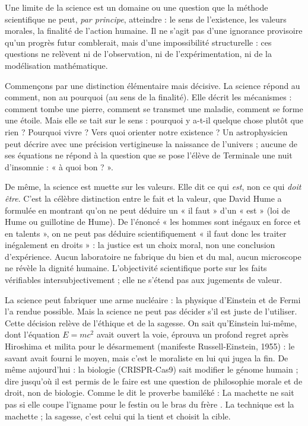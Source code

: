 \documentclass[11pt]{article}
\newcommand{\cle}[1]{{\popxbold\color{popdark}#1}}
\newcounter{popsec}
\newcounter{popsub}
\newcommand{\courssub}[1]{%
  \stepcounter{popsub}%
  \par\vspace{9pt}\noindent{\popxbold\fontsize{11.5}{13}\selectfont\color{popink}{\color{poporange}\thepopsec.\thepopsub}\hspace{6pt}#1}\par\nopagebreak\vspace{4pt}
}
\begin{document}
\courssub{Ce que la science ne peut pas dire : le sens et les valeurs}

\begin{definition}
Une \cle{limite} de la science est un domaine ou une question que la méthode scientifique ne peut, \emph{par principe}, atteindre : le sens de l'existence, les valeurs morales, la finalité de l'action humaine. Il ne s'agit pas d'une ignorance provisoire qu'un progrès futur comblerait, mais d'une impossibilité structurelle : ces questions ne relèvent ni de l'observation, ni de l'expérimentation, ni de la modélisation mathématique.
\end{definition}

Commençons par une distinction élémentaire mais décisive. La science répond au \cle{comment}, non au \cle{pourquoi} (au sens de la finalité). Elle décrit les mécanismes : comment tombe une pierre, comment se transmet une maladie, comment se forme une étoile. Mais elle se tait sur le sens : pourquoi y a-t-il quelque chose plutôt que rien ? Pourquoi vivre ? Vers quoi orienter notre existence ? Un astrophysicien peut décrire avec une précision vertigineuse la naissance de l'univers ; aucune de ses équations ne répond à la question que se pose l'élève de Terminale une nuit d'insomnie : « à quoi bon ? ».

De même, la science est muette sur les \cle{valeurs}. Elle dit ce qui \emph{est}, non ce qui \emph{doit être}. C'est la célèbre distinction entre le \cle{fait} et la \cle{valeur}, que David Hume a formulée en montrant qu'on ne peut déduire un « il faut » d'un « est » (loi de Hume ou guillotine de Hume). De l'énoncé « les hommes sont inégaux en force et en talents », on ne peut pas déduire scientifiquement « il faut donc les traiter inégalement en droits » : la justice est un choix moral, non une conclusion d'expérience. Aucun laboratoire ne fabrique du bien et du mal, aucun microscope ne révèle la dignité humaine. L'\cle{objectivité} scientifique porte sur les faits vérifiables intersubjectivement ; elle ne s'étend pas aux jugements de valeur.

\begin{exemplebox}
La science peut fabriquer une arme nucléaire : la physique d'Einstein et de Fermi l'a rendue possible. Mais la science ne peut pas décider s'il est juste de l'utiliser. Cette décision relève de l'\cle{éthique} et de la \cle{sagesse}. On sait qu'Einstein lui-même, dont l'équation $E = mc^2$ avait ouvert la voie, éprouva un profond regret après Hiroshima et milita pour le désarmement (manifeste Russell-Einstein, 1955) : le savant avait fourni le moyen, mais c'est le moraliste en lui qui jugea la fin. De même aujourd'hui : la biologie (CRISPR-Cas9) sait modifier le génome humain ; dire jusqu'où il est permis de le faire est une question de philosophie morale et de droit, non de biologie.
Comme le dit le proverbe bamiléké : \guillemotleft La machette ne sait pas si elle coupe l'igname pour le festin ou le bras du frère \guillemotright. La technique est la machette ; la sagesse, c'est celui qui la tient et choisit la cible.
\end{exemplebox}
\end{document}
